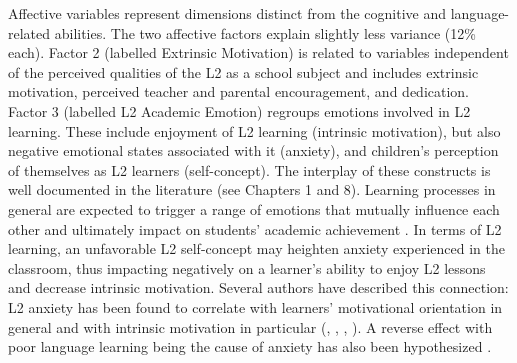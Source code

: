 \documentclass[output=paper]{langsci/langscibook}
\begin{document}
Affective variables represent dimensions distinct from the cognitive and lan\-guage-re\-lat\-ed abilities. The two affective factors explain slightly less variance (12\% each). Factor 2 (labelled Extrinsic Motivation) is related to variables independent of the perceived qualities of the L2 as a school subject and includes extrinsic motivation, perceived teacher and parental encouragement, and dedication. Factor 3 (labelled L2 Academic Emotion) regroups emotions involved in L2 learning. These include enjoyment of L2 learning (intrinsic motivation), but also negative emotional states associated with it (anxiety), and children’s perception of themselves as L2 learners (self-concept). The interplay of these constructs is well documented in the literature (see Chapters 1 and 8). Learning processes in general are expected to trigger a range of emotions that mutually influence each other and ultimately impact on students’ academic achievement \citep{PekrunEtAl2002}. In terms of L2 learning, an unfavorable L2 self-concept may heighten anxiety experienced in the classroom, thus impacting negatively on a learner’s ability to enjoy L2 lessons and decrease intrinsic motivation. Several authors have described this connection: L2 anxiety has been found to correlate with learners’ motivational orientation in general \citep[189]{Heinzmann2013} and with intrinsic motivation in particular (\citealt{NoelsEtAl2000}, \citealt{Stoeckli2004}, \citealt{KormosCsizer2008}, \citealt{LiuHuang2011}). A reverse effect with poor language learning being the cause of anxiety has also been hypothesized \citep{SparksEtAl2011}. 
\end{document}
